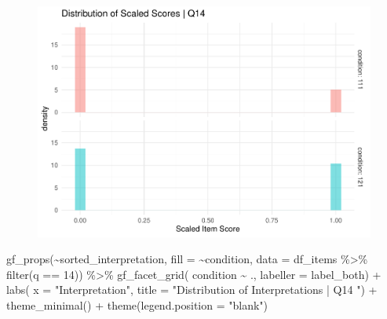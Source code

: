\documentclass[
  letterpaper,
  DIV=11,
  numbers=noendperiod]{scrreprt}
\newenvironment{Shaded}{\begin{snugshade}}{\end{snugshade}}
\newcommand{\AttributeTok}[1]{\textcolor[rgb]{0.40,0.45,0.13}{#1}}
\newcommand{\DecValTok}[1]{\textcolor[rgb]{0.68,0.00,0.00}{#1}}
\newcommand{\FunctionTok}[1]{\textcolor[rgb]{0.28,0.35,0.67}{#1}}
\newcommand{\NormalTok}[1]{\textcolor[rgb]{0.00,0.23,0.31}{#1}}
\newcommand{\SpecialCharTok}[1]{\textcolor[rgb]{0.37,0.37,0.37}{#1}}
\newcommand{\StringTok}[1]{\textcolor[rgb]{0.13,0.47,0.30}{#1}}
\begin{document}
\begin{figure}[H]

{\centering \includegraphics{analysis/SGC3A/2_sgc3A_scoring_files/figure-pdf/Q14-distribution-1.pdf}

}

\end{figure}

\begin{Shaded}
\begin{Highlighting}[]
\FunctionTok{gf\_props}\NormalTok{(}\SpecialCharTok{\textasciitilde{}}\NormalTok{sorted\_interpretation, }\AttributeTok{fill =} \SpecialCharTok{\textasciitilde{}}\NormalTok{condition, }\AttributeTok{data =}\NormalTok{ df\_items }\SpecialCharTok{\%\textgreater{}\%} \FunctionTok{filter}\NormalTok{(q }\SpecialCharTok{==} \DecValTok{14}\NormalTok{)) }\SpecialCharTok{\%\textgreater{}\%}
  \FunctionTok{gf\_facet\_grid}\NormalTok{( condition }\SpecialCharTok{\textasciitilde{}}\NormalTok{ ., }\AttributeTok{labeller =}\NormalTok{ label\_both) }\SpecialCharTok{+} 
  \FunctionTok{labs}\NormalTok{( }\AttributeTok{x =} \StringTok{"Interpretation"}\NormalTok{, }\AttributeTok{title =} \StringTok{"Distribution of Interpretations | Q14 "}\NormalTok{) }\SpecialCharTok{+} 
  \FunctionTok{theme\_minimal}\NormalTok{() }\SpecialCharTok{+} \FunctionTok{theme}\NormalTok{(}\AttributeTok{legend.position =} \StringTok{"blank"}\NormalTok{)}
\end{Highlighting}
\end{Shaded}
\end{document}
